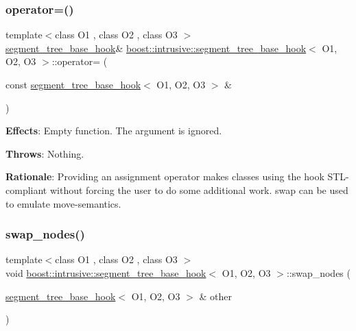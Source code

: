\subsubsection{\texorpdfstring{operator=()}{operator=()}}
{\footnotesize\ttfamily template$<$class O1 , class O2 , class O3 $>$ \\
\hyperlink{classboost_1_1intrusive_1_1segment__tree__base__hook}{segment\+\_\+tree\+\_\+base\+\_\+hook}\& \hyperlink{classboost_1_1intrusive_1_1segment__tree__base__hook}{boost\+::intrusive\+::segment\+\_\+tree\+\_\+base\+\_\+hook}$<$ O1, O2, O3 $>$\+::operator= (\begin{DoxyParamCaption}\item[{const \hyperlink{classboost_1_1intrusive_1_1segment__tree__base__hook}{segment\+\_\+tree\+\_\+base\+\_\+hook}$<$ O1, O2, O3 $>$ \&}]{ }\end{DoxyParamCaption})}

{\bfseries Effects}\+: Empty function. The argument is ignored.

{\bfseries Throws}\+: Nothing.

{\bfseries Rationale}\+: Providing an assignment operator makes classes using the hook S\+T\+L-\/compliant without forcing the user to do some additional work. {\ttfamily swap} can be used to emulate move-\/semantics. \mbox{\label{classboost_1_1intrusive_1_1segment__tree__base__hook_ab222e050b45faf013ebbd52d932cff39}} 
\subsubsection{\texorpdfstring{swap\+\_\+nodes()}{swap\_nodes()}}
{\footnotesize\ttfamily template$<$class O1 , class O2 , class O3 $>$ \\
void \hyperlink{classboost_1_1intrusive_1_1segment__tree__base__hook}{boost\+::intrusive\+::segment\+\_\+tree\+\_\+base\+\_\+hook}$<$ O1, O2, O3 $>$\+::swap\+\_\+nodes (\begin{DoxyParamCaption}\item[{\hyperlink{classboost_1_1intrusive_1_1segment__tree__base__hook}{segment\+\_\+tree\+\_\+base\+\_\+hook}$<$ O1, O2, O3 $>$ \&}]{other }\end{DoxyParamCaption})}

